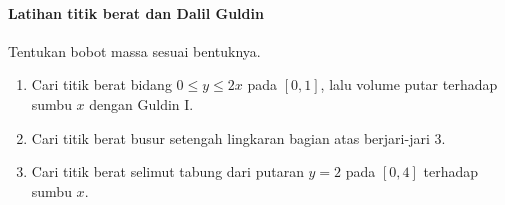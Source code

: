 \documentclass{../../kalkulus-ppt}
\begin{document}
\begin{frame}{\insertsection}
    \framesubtitle{Latihan titik berat dan Dalil Guldin}
    \begin{latihan}
        Tentukan bobot massa sesuai bentuknya.
        \begin{enumerate}
            \item Cari titik berat bidang $0\le y\le2x$ pada $[0,1]$,
                lalu volume putar terhadap sumbu $x$ dengan Guldin I.
            \item Cari titik berat busur setengah lingkaran bagian atas berjari-jari $3$.
            \item Cari titik berat selimut tabung dari putaran $y=2$ pada $[0,4]$
                terhadap sumbu $x$.
        \end{enumerate}
    \end{latihan}
\end{frame}
\end{document}
